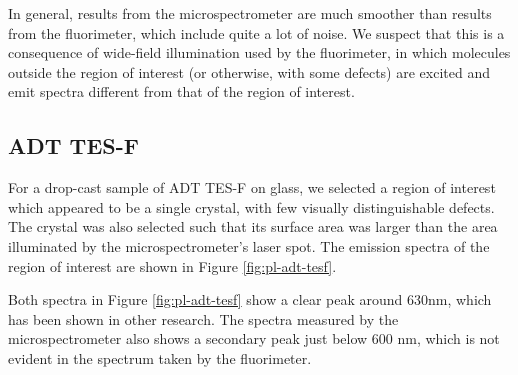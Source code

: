 In general, results from the microspectrometer are much smoother than results from the fluorimeter, which include quite a lot of noise.  We suspect that this is a consequence of wide-field illumination used by the fluorimeter, in which molecules outside the region of interest (or otherwise, with some defects) are excited and emit spectra different from that of the region of interest. 

\subsection{ADT TES-F}

For a drop-cast sample of ADT TES-F on glass, we selected a region of interest which appeared to be a single crystal, with few visually distinguishable defects. The crystal was also selected such that its surface area was larger than the area illuminated by the microspectrometer's laser spot. The emission spectra of the region of interest are shown in Figure \ref{fig:pl-adt-tesf}.


Both spectra in Figure \ref{fig:pl-adt-tesf} show a clear peak around 630nm, which has been shown in other research.\cite{lam_polarization_2018}\cite{ostroverkhova_organic_2016} The spectra measured by the microspectrometer also shows a secondary peak just below 600 nm, which is not evident in the spectrum taken by the fluorimeter. 

